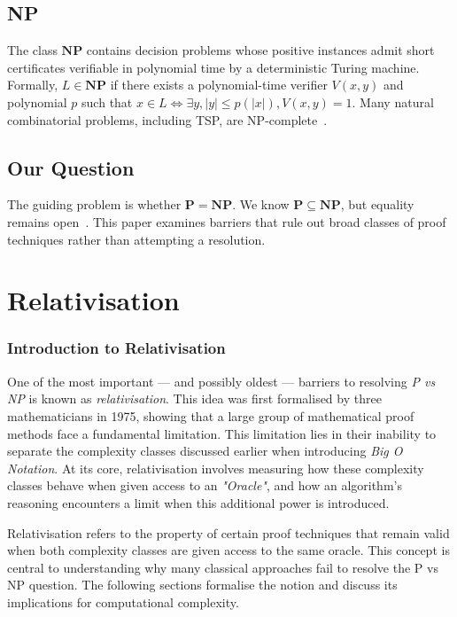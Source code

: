 \documentclass[12pt]{report}
\begin{document}
\section{NP}
The class $\mathbf{NP}$ contains decision problems whose positive instances admit short certificates verifiable in polynomial time by a deterministic Turing machine. Formally, $L\in\mathbf{NP}$ if there exists a polynomial-time verifier $V(x,y)$ and polynomial $p$ such that $x\in L \iff \exists y, |y|\le p(|x|), V(x,y)=1$. Many natural combinatorial problems, including TSP, are NP-complete~\cite{karp1972,held1962}.

\section{Our Question}
The guiding problem is whether $\mathbf{P}=\mathbf{NP}$. We know $\mathbf{P}\subseteq\mathbf{NP}$, but equality remains open~\cite{arora2009}. This paper examines barriers that rule out broad classes of proof techniques rather than attempting a resolution.

\newpage
\chapter{Relativisation}
\subsection{Introduction to Relativisation}
One of the most important --- and possibly oldest --- barriers to resolving \textit{P vs NP} is known as \textit{relativisation}.
This idea was first formalised by three mathematicians in 1975, showing that a large group of mathematical proof methods face a fundamental limitation.
This limitation lies in their inability to separate the complexity classes discussed earlier when introducing \textit{Big O Notation}.
At its core, relativisation involves measuring how these complexity classes behave when given access to an \textit{"Oracle"}, and how an algorithm's reasoning encounters a limit when this additional power is introduced.

Relativisation refers to the property of certain proof techniques that remain valid when both complexity classes are given access to the same oracle. This concept is central to understanding why many classical approaches fail to resolve the P vs NP question. The following sections formalise the notion and discuss its implications for computational complexity.
\end{document}
